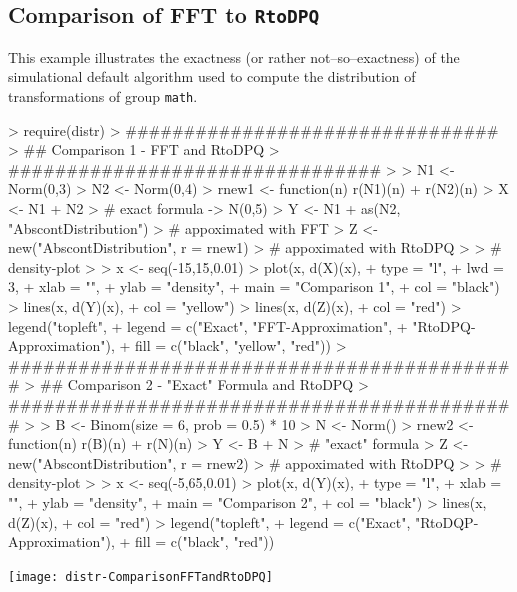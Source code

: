 \documentclass[11pt]{article}
\begin{document}
\subsection{Comparison of FFT to {\tt RtoDPQ}}\label{compex}
\begin{small}
  This example illustrates the exactness (or rather not--so--exactness) of the
  simulational default algorithm used to compute the distribution of
  transformations of group {\tt math}.
\end{small}
\begin{Schunk}
\begin{Sinput}
> require(distr)
> ################################
> ## Comparison 1 - FFT and RtoDPQ
> ################################
>
> N1 <- Norm(0,3)
> N2 <- Norm(0,4)
> rnew1 <- function(n) r(N1)(n) + r(N2)(n)
> X <- N1 + N2
>      # exact formula -> N(0,5)
> Y <- N1 + as(N2, "AbscontDistribution")
>      # appoximated with FFT
> Z <- new("AbscontDistribution", r = rnew1)
>      # appoximated with RtoDPQ
>
> # density-plot
>
> x <- seq(-15,15,0.01)
> plot(x, d(X)(x),
+      type = "l",
+      lwd = 3,
+      xlab = "",
+      ylab = "density",
+      main = "Comparison 1",
+      col = "black")
> lines(x, d(Y)(x),
+      col = "yellow")
> lines(x, d(Z)(x),
+      col = "red")
> legend("topleft",
+   legend = c("Exact", "FFT-Approximation",
+              "RtoDPQ-Approximation"),
+        fill = c("black", "yellow", "red"))
> ############################################
> ## Comparison 2 - "Exact" Formula and RtoDPQ
> ############################################
>
> B <- Binom(size = 6, prob = 0.5) * 10
> N <- Norm()
> rnew2 <- function(n) r(B)(n) + r(N)(n)
> Y <- B + N
>      # "exact" formula
> Z <- new("AbscontDistribution", r = rnew2)
>      # appoximated with RtoDPQ
>
> # density-plot
>
> x  <- seq(-5,65,0.01)
> plot(x, d(Y)(x),
+      type = "l",
+      xlab = "",
+      ylab = "density",
+      main = "Comparison 2",
+      col = "black")
> lines(x, d(Z)(x),
+      col = "red")
> legend("topleft",
+        legend = c("Exact", "RtoDQP-Approximation"),
+        fill = c("black", "red"))
\end{Sinput}
\end{Schunk}
\texttt{[image: distr-ComparisonFFTandRtoDPQ]}
\end{document}

